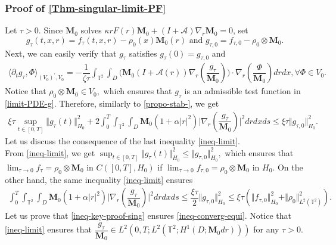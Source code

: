 \documentclass[a4paper,12pt, reqno]{amsart}
\newcommand{\T}{\mathbb{T}}
\newcommand{\M}{\mathbf{M}}
\begin{document}
\subsubsection*{Proof of \autoref{Thm-singular-limit-PF}}
Let $\tau>0.$
  Since $\mathbf{M}_0$ solves $\kappa rF(r)\M_0 + (I+\mathcal{A})\nabla_r \M_0=0$, set   $$g_\tau(t,x,r)= f_\tau(t,x,r)- \rho_0(x)\mathbf{M}_0(r) \text{ and } g_{\tau,0}=f_{\tau,0}- \rho_{0}\otimes\mathbf{M}_0.$$ Next, we can easily verify that $g_\tau$ satisfies $g_\tau(0)=g_{\tau,0}$ and 
   \begin{align}\label{limit-PDE-g}
    \langle\partial_t g_\tau,\Phi\rangle_{(V_0)^\prime,V_0}=- \dfrac{1}{\zeta \tau}\int_{\mathbb{T}^2}\int_D\bigl(\mathbf{M}_0 (I+\mathcal{A}(r))\nabla_r(\dfrac{g_\tau}{\mathbf{M}_0})\bigr)\cdot \nabla_r\left(\dfrac{\Phi}{\mathbf{M}_0}\right) drdx, \forall \Phi\in V_0.
\end{align}
Notice that $\rho_{0}\otimes\mathbf{M}_0\in V_0,$ which ensures that $g_\tau$ is an admissible test function in \eqref{limit-PDE-g}. Therefore, similarly to \autoref{propo-stab-}, we get
\begin{align}\label{ineq-limit}    \xi\tau \sup_{t\in [0,T]}\Vert g_\tau(t)\Vert_{H_0}^2+2\int_0^T\int_{\mathbb{T}^2}\int_D \mathbf{M}_0 (1+\alpha\vert r\vert^2)\vert \nabla_r(\dfrac{g_\tau}{\mathbf{M}_0})\vert^2 drdxds \leq   \xi\tau\Vert g_{\tau, 0}\Vert_{H_0}^2.
      \end{align}
      Let us discuss the consequence of the last inequality \eqref{ineq-limit}.\\
     From \eqref{ineq-limit}, we get $\displaystyle\sup_{t\in [0,T]}\Vert g_\tau(t)\Vert_{H_0}^2 \leq   \Vert g_{\tau, 0}\Vert_{H_0}^2,$ which ensures that $\displaystyle\lim_{\tau\to 0}f_\tau= \rho_0\otimes \mathbf{M}_0$ in $C([0,T],H_0)$ if $ \displaystyle\lim_{\tau\to 0}f_{\tau,0}= \rho_{0}\otimes\mathbf{M}_0$ in $H_0.$
          On the other hand, the same inequality \eqref{ineq-limit} ensures
          \begin{align}\label{ineq-key-proof-sing}
              \int_0^T\int_{\mathbb{T}^2}\int_D \mathbf{M}_0 (1+\alpha\vert r\vert^2)\vert \nabla_r(\dfrac{g_\tau}{\mathbf{M}_0})\vert^2 drdxds \leq   \dfrac{\xi\tau}{2}\Vert g_{\tau, 0}\Vert_{H_0}^2 \leq \xi\tau (\Vert f_{\tau, 0}\Vert_{H_0}^2+\Vert \rho_0 \Vert^2_{L^2(\mathbb{T}^2)}).
          \end{align}
          Let us prove that \eqref{ineq-key-proof-sing} ensures \eqref{ineq-converg-equi}. Notice that \eqref{ineq-limit} ensures that $\dfrac{g_\tau}{\mathbf{M}_0} \in L^2(0, T; L^2(\T^2; H^1(D; \M_0dr)))$ for any $\tau >0.$
\end{document}
